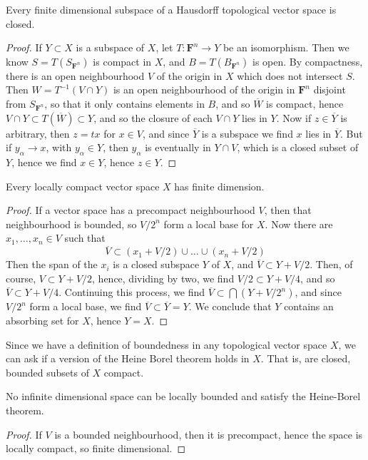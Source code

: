 \begin{corollary}
    Every finite dimensional subspace of a Hausdorff topological vector space is closed.
\end{corollary}
\begin{proof}
    If $Y \subset X$ is a subspace of $X$, let $T: \mathbf{F}^n \to Y$ be an isomorphism. Then we know $S = T(S_{\mathbf{F}^n})$ is compact in $X$, and $B = T(B_{\mathbf{F}^n})$ is open. By compactness, there is an open neighbourhood $V$ of the origin in $X$ which does not intersect $S$. Then $W = T^{-1}(V \cap Y)$ is an open neighbourhood of the origin in $\mathbf{F}^n$ disjoint from $S_{\mathbf{F}^n}$, so that it only contains elements in $B$, and so $\overline{W}$ is compact, hence $V \cap Y \subset T(\overline{W}) \subset Y$, and so the closure of each $V \cap Y$ lies in $Y$. Now if $z \in \overline{Y}$ is arbitrary, then $z = tx$ for $x \in V$, and since $\overline{Y}$ is a subspace we find $x$ lies in $\overline{Y}$. But if $y_\alpha \to x$, with $y_\alpha \in Y$, then $y_\alpha$ is eventually in $Y \cap V$, which is a closed subset of $Y$, hence we find $x \in Y$, hence $z \in Y$.
\end{proof}

\begin{theorem}
    Every locally compact vector space $X$ has finite dimension.
\end{theorem}
\begin{proof}
    If a vector space has a precompact neighbourhood $V$, then that neighbourhood is bounded, so $V/2^n$ form a local base for $X$. Now there are $x_1, \dots, x_n \in V$ such that
    \[ \overline{V} \subset (x_1 + V/2) \cup \dots \cup (x_n + V/2) \]
    Then the span of the $x_i$ is a closed subspace $Y$ of $X$, and $\overline{V} \subset Y + V/2$. Then, of course, $V \subset Y + V/2$, hence, dividing by two, we find $V/2 \subset Y + V/4$, and so $\overline{V} \subset Y + V/4$. Continuing this process, we find $\overline{V} \subset \bigcap (Y + V/2^n)$, and since $V/2^n$ form a local base, we find $\overline{V} \subset \overline{Y} = Y$. We conclude that $Y$ contains an absorbing set for $X$, hence $Y = X$.
\end{proof}

Since we have a definition of boundedness in any topological vector space $X$, we can ask if a version of the Heine Borel theorem holds in $X$. That is, are closed, bounded subsets of $X$ compact.

\begin{corollary}
    No infinite dimensional space can be locally bounded and satisfy the Heine-Borel theorem.
\end{corollary}
\begin{proof}
    If $V$ is a bounded neighbourhood, then it is precompact, hence the space is locally compact, so finite dimensional.
\end{proof}

